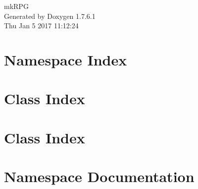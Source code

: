 \documentclass[a4paper]{book}
\begin{document}
\hypersetup{pageanchor=false,citecolor=blue}
\begin{titlepage}
\vspace*{7cm}
\begin{center}
{\Large mk\-R\-P\-G }\\
\vspace*{1cm}
{\large \-Generated by Doxygen 1.7.6.1}\\
\vspace*{0.5cm}
{\small Thu Jan 5 2017 11:12:24}\\
\end{center}
\end{titlepage}
\clearemptydoublepage
{}
\tableofcontents
\clearemptydoublepage
{}
\hypersetup{pageanchor=true,citecolor=blue}
\chapter{\-Namespace \-Index}

\chapter{\-Class \-Index}

\chapter{\-Class \-Index}

\chapter{\-Namespace \-Documentation}



































\end{document}
